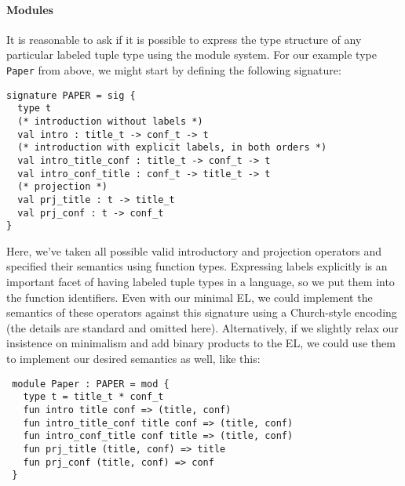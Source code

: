\paragraph{Modules}
It is reasonable to ask if it is possible to express the type structure of any particular labeled tuple type using the module system.  %
For our example type \lstinline{Paper} from above, we might start by defining the following signature:
\begin{lstlisting}
signature PAPER = sig {
  type t
  (* introduction without labels *)
  val intro : title_t -> conf_t -> t
  (* introduction with explicit labels, in both orders *)
  val intro_title_conf : title_t -> conf_t -> t
  val intro_conf_title : conf_t -> title_t -> t
  (* projection *)
  val prj_title : t -> title_t
  val prj_conf : t -> conf_t
}
\end{lstlisting}
Here, we've taken all possible valid introductory and projection operators and specified their semantics using function types. Expressing labels explicitly is an important facet of having labeled tuple types in a language, so we put them into the function identifiers. Even with our minimal EL, we could  implement the semantics of these operators against this signature using a Church-style encoding (the details are standard and omitted here). Alternatively, if we slightly relax  our insistence on minimalism and add binary products to the EL, we could use them to implement our desired semantics as well, like this:
\begin{lstlisting}
 module Paper : PAPER = mod {
   type t = title_t * conf_t
   fun intro title conf => (title, conf)
   fun intro_title_conf title conf => (title, conf)
   fun intro_conf_title conf title => (title, conf)
   fun prj_title (title, conf) => title 
   fun prj_conf (title, conf) => conf
 }
 \end{lstlisting}

